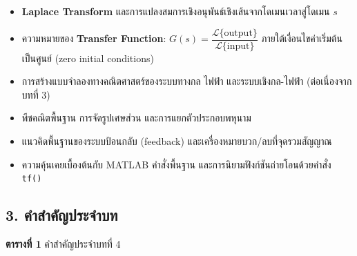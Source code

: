 \begin{itemize}
    \item \textbf{Laplace Transform} และการแปลงสมการเชิงอนุพันธ์เชิงเส้นจากโดเมนเวลาสู่โดเมน $s$
    \item ความหมายของ \textbf{Transfer Function}: $G(s) = \dfrac{\mathcal{L}\{\text{output}\}}{\mathcal{L}\{\text{input}\}}$ ภายใต้เงื่อนไขค่าเริ่มต้นเป็นศูนย์ (zero initial conditions)
    \item การสร้างแบบจำลองทางคณิตศาสตร์ของระบบทางกล ไฟฟ้า และระบบเชิงกล-ไฟฟ้า (ต่อเนื่องจากบทที่ 3)
    \item พีชคณิตพื้นฐาน การจัดรูปเศษส่วน และการแยกตัวประกอบพหุนาม
    \item แนวคิดพื้นฐานของระบบป้อนกลับ (feedback) และเครื่องหมายบวก/ลบที่จุดรวมสัญญาณ
    \item ความคุ้นเคยเบื้องต้นกับ MATLAB คำสั่งพื้นฐาน และการนิยามฟังก์ชันถ่ายโอนด้วยคำสั่ง \texttt{tf()}
\end{itemize}


\subsection{3. คำสำคัญประจำบท}

\textbf{ตารางที่ 1} คำสำคัญประจำบทที่ 4

